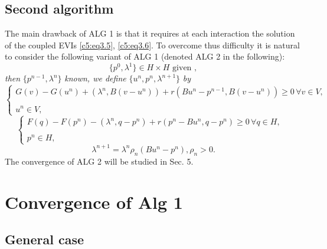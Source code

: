 \subsection{Second algorithm}\label{c5:ss3.2}%
  
The main drawback of ALG 1 is that it requires at each interaction the solution of the coupled EVIs \eqref{c5:eq3.5}, \eqref{c5:eq3.6}. To overcome thus difficulty it is natural to consider the following variant of ALG 1 (denoted ALG 2  in the following):
  \begin{equation}
\{p^0 , \lambda ^1 \} \in H \times H \text{ given }, \tag{3.7}\label{c5:eq3.7}
 \end{equation}  
\textit{then} $\{ p^{n-1}, \lambda^n \}$ \textit{known, we define} $\{ u^n, p^n, \lambda^{n+1} \}$ \textit{by}
{\fontsize{10}{12}\selectfont
\begin{equation}
\begin{cases}
G (v) - G (u^n) + (\lambda^n, B (v-u^n))  + r (Bu^n - p^{n-1}, B (v-u^n)) \geq 0\, \forall v \in V, \\
& \\
u^n \in V, \tag{3.8}\label{c5:eq3.8}
\end{cases}
\end{equation}}\relax
\begin{equation}
\begin{cases}
F(q) - F (p^n) - (\lambda^n, q-p^n) + r (p^n - Bu^n, q-p^n) \geq 0\, \forall q \in H, \\
& \\
p^n \in H, \tag{3.9}\label{c5:eq3.9}
\end{cases}
\end{equation}\pageoriginale 
\begin{equation}
\lambda^{n+1} = \lambda^n \rho_n (Bu^n - p^n), \rho_n > 0. \tag{3.10}\label{c5:eq3.10}
 \end{equation}
 The convergence  of ALG 2 will be studied in Sec. 5.
 
\section{Convergence of Alg 1}\label{c5:s4}%
 
\subsection{General case}\label{c5:ss4.1}%
 
